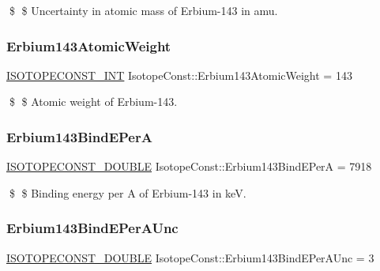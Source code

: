 \$ \$ Uncertainty in atomic mass of Erbium-\/143 in amu. \mbox{\label{group___isotope_const-_erbium-_er143_ga9ebed6cc8d414855385d856be282c641}} 
\subsubsection{\texorpdfstring{Erbium143\+Atomic\+Weight}{Erbium143AtomicWeight}}
{\footnotesize\ttfamily \mbox{\hyperlink{group___isotope_const-_macros_ga5f18360b3e99483a35c32d789e62621c}{I\+S\+O\+T\+O\+P\+E\+C\+O\+N\+S\+T\+\_\+\+I\+NT}} Isotope\+Const\+::\+Erbium143\+Atomic\+Weight = 143}

\$ \$ Atomic weight of Erbium-\/143. \mbox{\label{group___isotope_const-_erbium-_er143_ga4b2e3e1f89dbd0a7e85429b35bbb8cc3}} 
\subsubsection{\texorpdfstring{Erbium143\+Bind\+E\+PerA}{Erbium143BindEPerA}}
{\footnotesize\ttfamily \mbox{\hyperlink{group___isotope_const-_macros_ga8f45a7272ce02c0b4c65c44636ed719a}{I\+S\+O\+T\+O\+P\+E\+C\+O\+N\+S\+T\+\_\+\+D\+O\+U\+B\+LE}} Isotope\+Const\+::\+Erbium143\+Bind\+E\+PerA = 7918}

\$ \$ Binding energy per A of Erbium-\/143 in keV. \mbox{\label{group___isotope_const-_erbium-_er143_ga95194bf19ed36b6551776fc9acc899a3}} 
\subsubsection{\texorpdfstring{Erbium143\+Bind\+E\+Per\+A\+Unc}{Erbium143BindEPerAUnc}}
{\footnotesize\ttfamily \mbox{\hyperlink{group___isotope_const-_macros_ga8f45a7272ce02c0b4c65c44636ed719a}{I\+S\+O\+T\+O\+P\+E\+C\+O\+N\+S\+T\+\_\+\+D\+O\+U\+B\+LE}} Isotope\+Const\+::\+Erbium143\+Bind\+E\+Per\+A\+Unc = 3}

